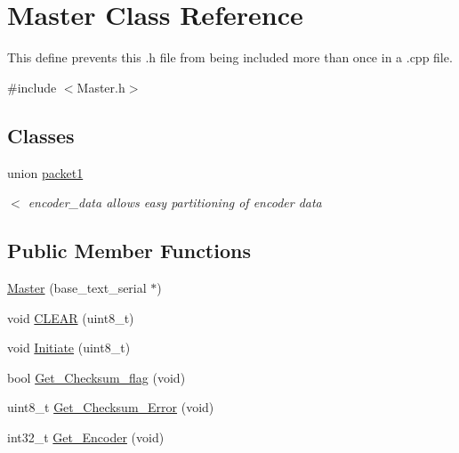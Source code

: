 \hypertarget{class_master}{\section{Master Class Reference}
\label{class_master}
}


This define prevents this .h file from being included more than once in a .cpp file.  




{\ttfamily \#include $<$Master.\-h$>$}

\subsection*{Classes}
\begin{DoxyCompactItemize}
\item 
union \hyperlink{union_master_1_1packet1}{packet1}
\begin{DoxyCompactList}\small\item\em $<$ encoder\-\_\-data allows easy partitioning of encoder data \end{DoxyCompactList}\end{DoxyCompactItemize}
\subsection*{Public Member Functions}
\begin{DoxyCompactItemize}
\item 
\hyperlink{class_master_a39589d526331f8b5abf9d405a5ea7fe7}{Master} (base\-\_\-text\-\_\-serial $\ast$)
\item 
void \hyperlink{class_master_ad85c13cad19e5600c6d2dff28aaa0a52}{C\-L\-E\-A\-R} (uint8\-\_\-t)
\item 
void \hyperlink{class_master_af507aba60a24105be4b58a441780fa28}{Initiate} (uint8\-\_\-t)
\item 
bool \hyperlink{class_master_af5baf3043c5c903472a906cd29643725}{Get\-\_\-\-Checksum\-\_\-flag} (void)
\item 
uint8\-\_\-t \hyperlink{class_master_ac93f188774888e736f1bcb3345e6f208}{Get\-\_\-\-Checksum\-\_\-\-Error} (void)
\item 
int32\-\_\-t \hyperlink{class_master_ac6036259c4c2c8f4f3a11fd36ae23a6b}{Get\-\_\-\-Encoder} (void)
\end{DoxyCompactItemize}
